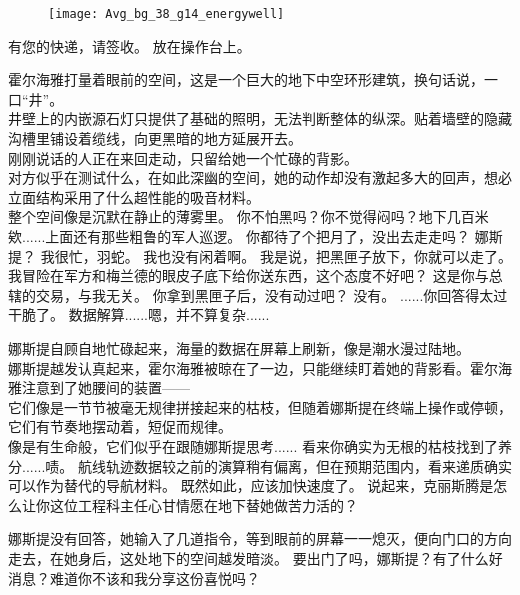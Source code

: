 \documentclass[openany]{book}
\begin{document}
\begin{figure}[h]
    \centering
    \texttt{[image: Avg\_bg\_38\_g14\_energywell]}
\end{figure}
\begin{dialogue}
     有您的快递，请签收。
     放在操作台上。\par
    霍尔海雅打量着眼前的空间，这是一个巨大的地下中空环形建筑，换句话说，一口“井”。\\
    井壁上的内嵌源石灯只提供了基础的照明，无法判断整体的纵深。贴着墙壁的隐藏沟槽里铺设着缆线，向更黑暗的地方延展开去。\\
    刚刚说话的人正在来回走动，只留给她一个忙碌的背影。\\
    对方似乎在测试什么，在如此深幽的空间，她的动作却没有激起多大的回声，想必立面结构采用了什么超性能的吸音材料。\\
    整个空间像是沉默在静止的薄雾里。
     你不怕黑吗？你不觉得闷吗？地下几百米欸......上面还有那些粗鲁的军人巡逻。
     你都待了个把月了，没出去走走吗？
     娜斯提？
     我很忙，羽蛇。
     我也没有闲着啊。
     我是说，把黑匣子放下，你就可以走了。
     我冒险在军方和梅兰德的眼皮子底下给你送东西，这个态度不好吧？
     这是你与总辖的交易，与我无关。
     你拿到黑匣子后，没有动过吧？
     没有。
     ......你回答得太过干脆了。
     数据解算......嗯，并不算复杂......\par
    娜斯提自顾自地忙碌起来，海量的数据在屏幕上刷新，像是潮水漫过陆地。\\
    娜斯提越发认真起来，霍尔海雅被晾在了一边，只能继续盯着她的背影看。霍尔海雅注意到了她腰间的装置——\\
    它们像是一节节被毫无规律拼接起来的枯枝，但随着娜斯提在终端上操作或停顿，它们有节奏地摆动着，短促而规律。\\
    像是有生命般，它们似乎在跟随娜斯提思考......
     看来你确实为无根的枯枝找到了养分......啧。
     航线轨迹数据较之前的演算稍有偏离，但在预期范围内，看来递质确实可以作为替代的导航材料。
     既然如此，应该加快速度了。
     说起来，克丽斯腾是怎么让你这位工程科主任心甘情愿在地下替她做苦力活的？\par
    娜斯提没有回答，她输入了几道指令，等到眼前的屏幕一一熄灭，便向门口的方向走去，在她身后，这处地下的空间越发暗淡。
     要出门了吗，娜斯提？有了什么好消息？难道你不该和我分享这份喜悦吗？

\end{dialogue}
\end{document}
